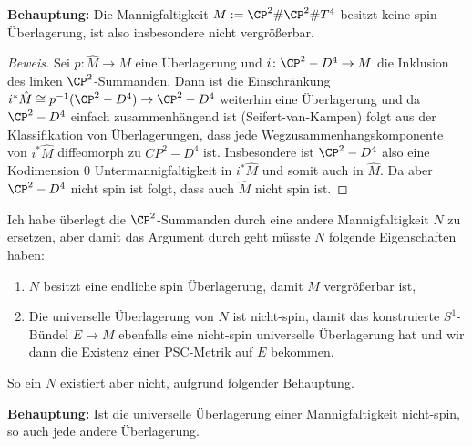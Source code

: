 \noindent \textbf{Behauptung:} Die Mannigfaltigkeit $M := \CP^2 \# \CP^2 \# T^4$ besitzt keine spin Überlagerung, ist also insbesondere nicht vergrößerbar.

    \begin{proof}[Beweis]
      Sei $p \colon \hat{M} \to M$ eine Überlagerung und $i \colon \CP^2 - D^4 \to M$ die Inklusion des linken $\CP^2$-Summanden. Dann ist die Einschränkung $i^\ast \hat{M} \cong p^{-1}(\CP^2-D^4) \to \CP^2 - D^4$ weiterhin eine Überlagerung und da $\CP^2-D^4$ einfach zusammenhängend ist (Seifert-van-Kampen) folgt aus der Klassifikation von Überlagerungen, dass jede Wegzusammenhangskomponente von $i^\ast \hat{M}$ diffeomorph zu $CP^2-D^4$ ist. Insbesondere ist $\CP^2-D^4$ also eine Kodimension $0$ Untermannigfaltigkeit in $i^\ast\hat{M}$ und somit auch in $\hat{M}$. Da aber $\CP^2-D^4$ nicht spin ist folgt, dass auch $\hat{M}$ nicht spin ist.
    \end{proof}

    Ich habe überlegt die $\CP^2$-Summanden durch eine andere Mannigfaltigkeit $N$ zu ersetzen, aber damit das Argument durch geht müsste $N$ folgende Eigenschaften haben:
    \begin{enumerate}[label=\roman*)]
      \item $N$ besitzt eine endliche spin Überlagerung, damit $M$ vergrößerbar ist,
      \item Die universelle Überlagerung von $N$ ist nicht-spin, damit das konstruierte $S^1$-Bündel $E \to M$ ebenfalls eine nicht-spin universelle Überlagerung hat und wir dann die Existenz einer PSC-Metrik auf $E$ bekommen.
    \end{enumerate}

    \noindent So ein $N$ existiert aber nicht, aufgrund folgender Behauptung. \vspace{.75em}
    
    \noindent\textbf{Behauptung:} Ist die universelle Überlagerung einer Mannigfaltigkeit nicht-spin, so auch jede andere Überlagerung.
    
